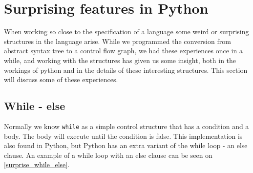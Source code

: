 \section{Surprising features in Python}
When working so close to the specification of a language some weird or surprising structures in the language arise.
While we programmed the conversion from abstract syntax tree to a control flow graph, we had these experiences once in a while, and working with the structures has given us some insight, both in the workings of python and in the details of these interesting structures.
This section will discuss some of these experiences.

\subsection{While - else}
Normally we know \texttt{while} as a simple control structure that has a condition and a body.
The body will execute until the condition is false.
This implementation is also found in Python, but Python has an extra variant of the while loop - an else clause.
An example of a while loop with an else clause can be seen on \cref{surprise_while_else}.

